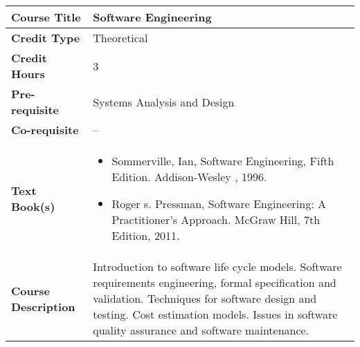 \documentclass[11pt]{article}
\begin{document}
\begin{table}[h!]
\begin{tabular}{|l|l|}
\hline
\textbf{Course Title}       &   Software Engineering\\ \hline
\textbf{Credit Type}        &  Theoretical \\ \hline
\textbf{Credit Hours}       & 3 \\ \hline
\textbf{Pre-requisite}       &   Systems Analysis and Design \\ \hline
\textbf{Co-requisite}       & -- \\ \hline
\textbf{Text Book(s)}       & \begin{minipage}{.70\textwidth}
\begin{itemize} \itemsep-0.4em
	\vspace{3mm}
	\item Sommerville, Ian, Software Engineering, Fifth Edition. Addison-Wesley , 1996.
	\item Roger s. Pressman, Software Engineering: A Practitioner's Approach. McGraw Hill, 7th Edition, 2011.
	\vspace{3mm}
\end{itemize}
\end{minipage}\\ \hline
\textbf{Course Description} & \begin{minipage}{.70\textwidth}
\vspace{3mm}
Introduction to software life cycle models.
Software requirements engineering, formal specification and validation. Techniques for software
design and testing. Cost estimation models. Issues in software quality assurance and software
maintenance.
\vspace{3mm}
\end{minipage} \\ \hline
\end{tabular}
\end{table}
\end{document}
